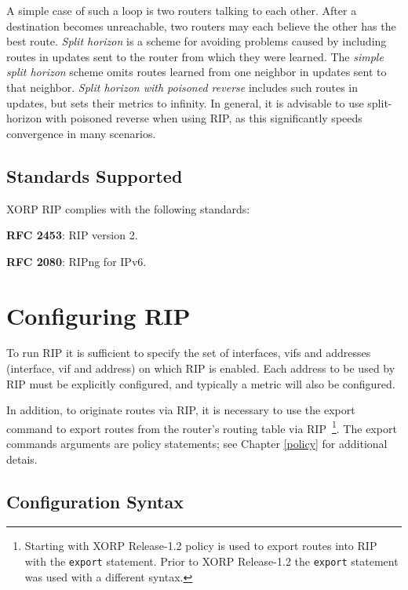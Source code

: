 A simple case of such a loop is two routers talking to each other.
After a destination becomes unreachable, two routers may each believe
the other has the best route.  {\it Split horizon} is a scheme for
avoiding problems caused by including routes in updates sent to the
router from which they were learned.  The {\it simple split horizon}
scheme omits routes learned from one neighbor in updates sent to that
neighbor.  {\it Split horizon with poisoned reverse} includes such
routes in updates, but sets their metrics to infinity.  In general, it
is advisable to use split-horizon with poisoned reverse when using
RIP, as this significantly speeds convergence in many scenarios.

\subsection{Standards Supported}

XORP RIP complies with the following standards:
\begin{description}
\item{\bf RFC 2453}: RIP version 2.
\item{\bf RFC 2080}: RIPng for IPv6.
\end{description} 

\newpage
\section{Configuring RIP}

To run RIP it is sufficient to specify the set of interfaces, vifs and
addresses ({\stt interface}, {\stt vif} and {\stt address}) on which
RIP is enabled.  Each {\stt address} to be used by RIP must be
explicitly configured, and typically a metric will also be configured.

In addition, to originate routes via RIP, it is necessary to use the
{\stt export} command to export routes from the router's routing table
via RIP~\footnote{Starting with XORP Release-1.2 policy is used to
export routes into RIP with the {\tt export} statement.  Prior to XORP
Release-1.2 the {\tt export} statement was used with a different syntax.}.
The {\stt export} commands arguments are policy statements;
see Chapter \ref{policy} for additional detais.

\subsection{Configuration Syntax}

